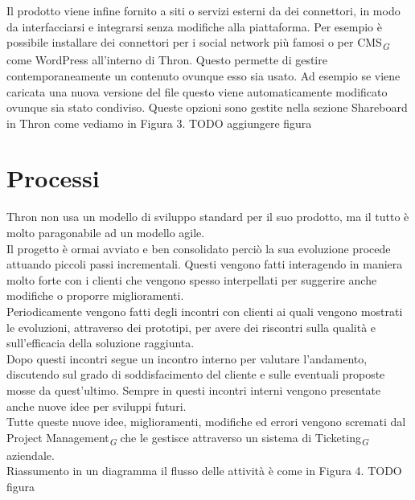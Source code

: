 \documentclass[a4paper, 12pt, twoside, openright]{book}
\newcommand{\gloss}[1]{#1\textsubscript{\textit{\tiny{G}}}}
\begin{document}
Il prodotto viene infine fornito a siti o servizi esterni da dei connettori, in modo da interfacciarsi e integrarsi senza modifiche alla piattaforma. Per esempio è possibile installare dei connettori per i social network più famosi o per \gloss{CMS} come WordPress all'interno di Thron. Questo permette di gestire contemporaneamente un contenuto ovunque esso sia usato. Ad esempio se viene caricata una nuova versione del file questo viene automaticamente modificato ovunque sia stato condiviso. Queste opzioni sono gestite nella sezione Shareboard in Thron come vediamo in Figura 3. TODO aggiungere figura

\section{Processi}
Thron non usa un modello di sviluppo standard per il suo prodotto, ma il tutto è molto paragonabile ad un modello agile.\\
Il progetto è ormai avviato e ben consolidato perciò la sua evoluzione procede attuando piccoli passi incrementali. Questi vengono fatti interagendo in maniera molto forte con i clienti che vengono spesso interpellati per suggerire anche modifiche o proporre miglioramenti.\\
Periodicamente vengono fatti degli incontri con clienti ai quali vengono mostrati le evoluzioni, attraverso dei prototipi, per avere dei riscontri sulla qualità e sull'efficacia della soluzione raggiunta.\\
Dopo questi incontri segue un incontro interno per valutare l'andamento, discutendo sul grado di soddisfacimento del cliente e sulle eventuali proposte mosse da quest'ultimo. Sempre in questi incontri interni vengono presentate anche nuove idee per sviluppi futuri.\\
Tutte queste nuove idee, miglioramenti, modifiche ed errori vengono scremati dal \gloss{Project Management} che le gestisce attraverso un sistema di \gloss{Ticketing} aziendale.\\
Riassumento in un diagramma il flusso delle attività è come in Figura 4. TODO figura
\end{document}
